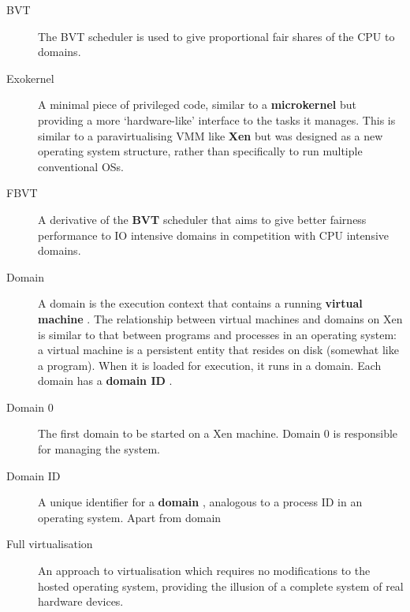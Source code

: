 \documentclass[11pt,twoside,final,openright]{xenstyle}
\begin{document}
{\begin{description}
\item[BVT]                 The BVT scheduler is used to give proportional
                           fair shares of the CPU to domains.

\item[Exokernel]           A minimal piece of privileged code, similar to
                           a {\bf microkernel} but providing a more
                           `hardware-like' interface to the tasks it
                           manages.  This is similar to a paravirtualising
                           VMM like {\bf Xen} but was designed as a new
                           operating system structure, rather than
                           specifically to run multiple conventional OSs.

\item[FBVT]                A derivative of the { \bf BVT } scheduler that
                           aims to give better fairness performance to IO
                           intensive domains in competition with CPU
                           intensive domains.

\item[Domain]              A domain is the execution context that
                           contains a running { \bf virtual machine }.
                           The relationship between virtual machines
                           and domains on Xen is similar to that between
                           programs and processes in an operating
                           system: a virtual machine is a persistent
                           entity that resides on disk (somewhat like
                           a program).  When it is loaded for execution,
                           it runs in a domain.  Each domain has a
                           { \bf domain ID }.

\item[Domain 0]            The first domain to be started on a Xen
                           machine.  Domain 0 is responsible for managing
                           the system.

\item[Domain ID]           A unique identifier for a { \bf domain },
                           analogous to a process ID in an operating
                           system.  Apart from domain

\item[Full virtualisation] An approach to virtualisation which
                           requires no modifications to the hosted
                           operating system, providing the illusion of
                           a complete system of real hardware devices.


\end{description}}
\end{document}
